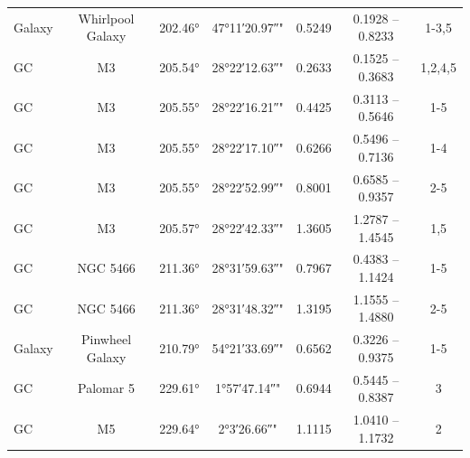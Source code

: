 \begin{longtable}{l c c c c c c}
    Galaxy       & Whirlpool Galaxy                  & \ang{202.46} & \ang{+47;11;20.97}" & 0.5249   & 0.1928 -- 0.8233 & 1-3,5       \\ %
    GC           & M3                                & \ang{205.54} & \ang{+28;22;12.63}" & 0.2633   & 0.1525 -- 0.3683 & 1,2,4,5     \\ %
    GC           & M3                                & \ang{205.55} & \ang{+28;22;16.21}" & 0.4425   & 0.3113 -- 0.5646 & 1-5         \\ %
    GC           & M3                                & \ang{205.55} & \ang{+28;22;17.10}" & 0.6266   & 0.5496 -- 0.7136 & 1-4         \\ %
    GC           & M3                                & \ang{205.55} & \ang{+28;22;52.99}" & 0.8001   & 0.6585 -- 0.9357 & 2-5         \\ %
    GC           & M3                                & \ang{205.57} & \ang{+28;22;42.33}" & 1.3605   & 1.2787 -- 1.4545 & 1,5         \\ %
    GC           & NGC 5466                          & \ang{211.36} & \ang{+28;31;59.63}" & 0.7967   & 0.4383 -- 1.1424 & 1-5         \\ %
    GC           & NGC 5466                          & \ang{211.36} & \ang{+28;31;48.32}" & 1.3195   & 1.1555 -- 1.4880 & 2-5         \\ %
    Galaxy       & Pinwheel Galaxy                   & \ang{210.79} & \ang{+54;21;33.69}" & 0.6562   & 0.3226 -- 0.9375 & 1-5         \\ %
    GC           & Palomar 5                         & \ang{229.61} & \ang{+1;57;47.14}"  & 0.6944   & 0.5445 -- 0.8387 & 3           \\ %
    GC           & M5                                & \ang{229.64} & \ang{+2;3;26.66}"   & 1.1115   & 1.0410 -- 1.1732 & 2           \\ %
    \bottomrule
\end{longtable}

